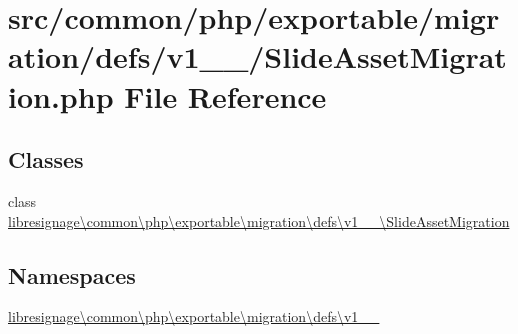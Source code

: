 \hypertarget{v1__0__0_2SlideAssetMigration_8php}{}\section{src/common/php/exportable/migration/defs/v1\+\_\+\_/\+Slide\+Asset\+Migration.php File Reference}
\label{v1__0__0_2SlideAssetMigration_8php}
\subsection*{Classes}
\begin{DoxyCompactItemize}
\item 
class \hyperlink{classlibresignage_1_1common_1_1php_1_1exportable_1_1migration_1_1defs_1_1v1__0__0_1_1SlideAssetMigration}{libresignage\textbackslash{}common\textbackslash{}php\textbackslash{}exportable\textbackslash{}migration\textbackslash{}defs\textbackslash{}v1\+\_\+\_\textbackslash{}\+Slide\+Asset\+Migration}
\end{DoxyCompactItemize}
\subsection*{Namespaces}
\begin{DoxyCompactItemize}
\item 
 \hyperlink{namespacelibresignage_1_1common_1_1php_1_1exportable_1_1migration_1_1defs_1_1v1__0__0}{libresignage\textbackslash{}common\textbackslash{}php\textbackslash{}exportable\textbackslash{}migration\textbackslash{}defs\textbackslash{}v1\+\_\+\_}
\end{DoxyCompactItemize}
